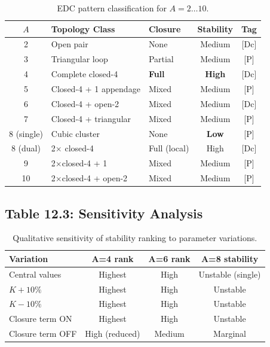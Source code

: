 \begin{table}[h]
\centering
\caption{EDC pattern classification for $A = 2 \ldots 10$.}
\label{tab:pattern}
\begin{tabular}{cllcc}
    \toprule
    $A$ & Topology Class & Closure & Stability & Tag \\
    \midrule
    2 & Open pair & None & Medium & [Dc] \\
    3 & Triangular loop & Partial & Medium & [P] \\
    4 & Complete closed-4 & \textbf{Full} & \textbf{High} & [Dc] \\
    5 & Closed-4 + 1 appendage & Mixed & Medium & [P] \\
    6 & Closed-4 + open-2 & Mixed & Medium & [Dc] \\
    7 & Closed-4 + triangular & Mixed & Medium & [P] \\
    8 (single) & Cubic cluster & None & \textbf{Low} & [P] \\
    8 (dual) & 2$\times$ closed-4 & Full (local) & High & [Dc] \\
    9 & 2$\times$closed-4 + 1 & Mixed & Medium & [P] \\
    10 & 2$\times$closed-4 + open-2 & Mixed & Medium & [P] \\
    \bottomrule
\end{tabular}
\end{table}

\subsection{Table 12.3: Sensitivity Analysis}

\begin{table}[h]
\centering
\caption{Qualitative sensitivity of stability ranking to parameter variations.}
\label{tab:light:sensitivity}
\begin{tabular}{lccc}
    \toprule
    Variation & A=4 rank & A=6 rank & A=8 stability \\
    \midrule
    Central values & Highest & High & Unstable (single) \\
    $K + 10\%$ & Highest & High & Unstable \\
    $K - 10\%$ & Highest & High & Unstable \\
    Closure term ON & Highest & High & Unstable \\
    Closure term OFF & High (reduced) & Medium & Marginal \\
    \bottomrule
\end{tabular}
\end{table}

